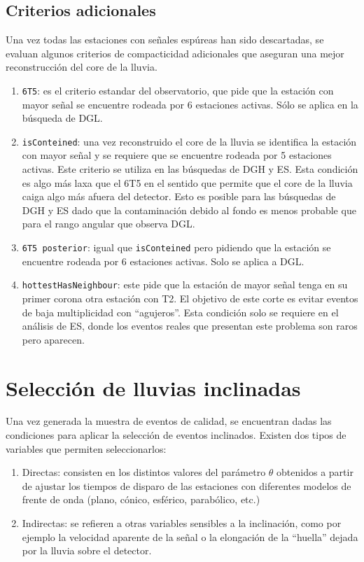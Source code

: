 	
	\subsection{Criterios adicionales}
	
	Una vez todas las estaciones con señales espúreas han sido descartadas, se evaluan algunos criterios de compacticidad adicionales que aseguran una mejor reconstrucción del core de la lluvia.
	
	\begin{enumerate}
	 \item \texttt{6T5}: es el criterio estandar del observatorio, que pide que la estación con mayor señal se encuentre rodeada por 6 estaciones activas. Sólo se aplica en la búsqueda de DGL.
	 \item \texttt{isConteined}: una vez reconstruido el core de la lluvia se identifica la estación con mayor señal y se requiere que se encuentre rodeada por 5 estaciones activas. Este criterio se utiliza en las búsquedas de DGH y ES. Esta condición es algo más laxa que el 6T5 en el sentido que permite que el core de la lluvia caiga algo más afuera del detector. Esto es posible para las búsquedas de DGH y ES dado que la contaminación debido al fondo es menos probable que para el rango angular que observa DGL.
	 \item \texttt{6T5 posterior}: igual que \texttt{isConteined} pero pidiendo que la estación se encuentre rodeada por 6 estaciones activas. Solo se aplica a DGL.
	 \item \texttt{hottestHasNeighbour}: este pide que la estación de mayor señal tenga en su primer corona otra estación con T2. El objetivo de este corte es evitar eventos de baja multiplicidad con ``agujeros''. Esta condición solo se requiere en el análisis de ES, donde los eventos reales que presentan este problema son raros pero aparecen.
	\end{enumerate}
	
\section{Selecci\'on de lluvias inclinadas}

Una vez generada la muestra de eventos de calidad, se encuentran dadas las condiciones para aplicar la selección de eventos inclinados.
Existen dos tipos de variables que permiten seleccionarlos:
\begin{enumerate}
 \item Directas: consisten en los distintos valores del parámetro $\theta$ obtenidos a partir de ajustar los tiempos de disparo de las estaciones con diferentes modelos de frente de onda (plano, cónico, esférico, parabólico, etc.)
 \item Indirectas: se refieren a otras variables sensibles a la inclinación, como por ejemplo la velocidad aparente de la señal o la elongación de la ``huella'' dejada por la lluvia sobre el detector.
\end{enumerate}
	
